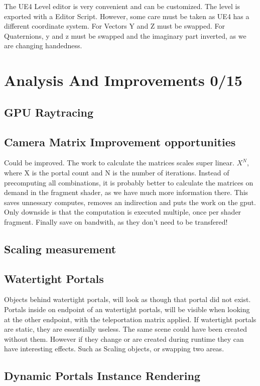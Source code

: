 The UE4 Level editor is very convenient and can be customized. The level is exported with a Editor Script. However, some care must be taken as UE4 has a different coordinate system. For Vectors Y and Z must be swapped. For Quaternions, y and z must be swapped and the imaginary part inverted, as we are changing handedness.


\section{Analysis And Improvements 0/15}

\subsection{GPU Raytracing}

\subsection{Camera Matrix Improvement opportunities}
Could be improved. The work to calculate the matrices scales super linear. $X^{N}$, where X is the portal count and N is the number of iterations.
Instead of precomputing all combinations, it is probably better to calculate the matrices on demand in the fragment shader, as we have much more information there. This saves unnessary computes, removes an indirection and puts the work on the gput. Only downside is that the computation is executed multiple, once per shader fragment. Finally save on bandwith, as they don't need to be transfered!

\subsection{Scaling measurement}

\subsection{Watertight Portals}
Objects behind watertight portals, will look as though that portal did not exist. Portals inside on endpoint of an watertight portals, will be visible when looking at the other endpoint, with the teleportation matrix applied. If watertight portals are static, they are essentially useless. The same scene could have been created without them.
However if they change or are created during runtime they can have interesting effects. Such as Scaling objects, or swapping two areas.

\subsection{Dynamic Portals Instance Rendering}


